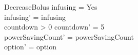 \begin{schema}{DecreaseBolus}
	infusing = Yes\\
	infusing' = infusing\\
	countdown > 0 \land countdown' = 5\\
	powerSavingCount' = powerSavingCount\\ option' = option\\
\end{schema}

